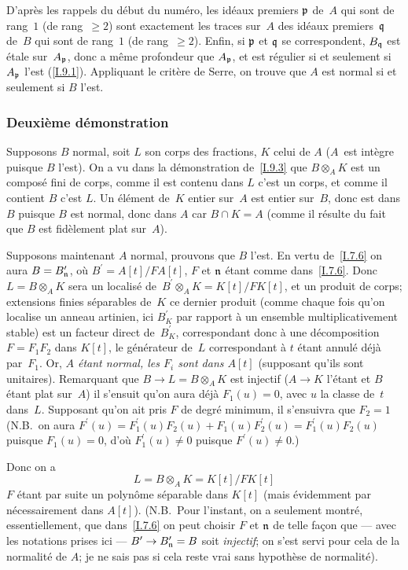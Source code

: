 D'apr\`es les rappels du d\'ebut du num\'ero, les id\'eaux
premiers $\mathfrak{p}$ de~$A$ qui sont de rang~$1$ (\resp de
rang~$\ge2$) sont exactement les traces sur~$A$ des id\'eaux
premiers~$\mathfrak{q}$ de~$B$ qui sont de rang~$1$ (\resp de
rang~$\ge2$). Enfin, si $\mathfrak{p}$ et $\mathfrak{q}$ se correspondent,
$B_{\mathfrak{q}}$ est \'etale sur~$A_{\mathfrak{p}}$, donc a m\^eme
profondeur que $A_{\mathfrak{p}}$, et est r\'egulier si et seulement si
$A_{\mathfrak{p}}$ l'est (\ref{I.9.1}). Appliquant le crit\`ere de Serre, on
trouve que $A$ est normal si et seulement si $B$ l'est.

\subsubsection*{Deuxi\`eme d\'emonstration}
Supposons $B$ normal, soit $L$ son corps des fractions, $K$ celui de
$A$ ($A$~est int\`egre puisque $B$ l'est). On a vu dans la
d\'emonstration de~\ref{I.9.3} que $B\otimes_A K$ est un compos\'e fini de
corps, comme il est contenu dans $L$ c'est un corps, et comme il
contient $B$ c'est $L$. Un \'el\'ement de~$K$ entier sur~$A$ est
entier sur~$B$, donc est dans $B$ puisque
$B$
est normal, donc dans $A$ car $B\cap K=A$ (comme il r\'esulte du
fait que $B$ est fid\`element plat sur~$A$).

Supposons maintenant $A$ normal, prouvons que $B$ l'est. En vertu
de~\ref{I.7.6} on aura $B=B^\prime_{\mathfrak{n}}$, o\`u $B^\prime=A[t]/FA[t]$,
$F$ et $\mathfrak{n}$ \'etant comme dans~\ref{I.7.6}. Donc $L=B\otimes_A K$
sera un localis\'e de~$B^\prime\otimes_A K=K[t]/FK[t]$, et un
produit de corps; extensions finies s\'eparables de~$K$ ce dernier
produit (comme chaque fois qu'on localise un anneau artinien, ici
$B^\prime_K$ par rapport \`a un ensemble multiplicativement stable)
est un facteur direct de~$B^\prime_K$, correspondant donc \`a une
d\'ecomposition $F=F_1F_2$ dans $K[t]$, le g\'en\'erateur de~$L$
correspondant \`a $t$ \'etant annul\'e d\'ej\`a par~$F_1$.
Or, \emph{$A$ étant normal, les $F_i$ sont dans $A[t]$} (supposant
qu'ils sont unitaires). Remarquant que $B\to L=B\otimes_A K$ est
injectif ($A\to K$ l'\'etant et $B$ \'etant plat sur~$A$) il
s'ensuit qu'on aura d\'ej\`a
$F_1(u)=0$, avec $u$ la
classe de~$t$ dans~$L$.
Supposant qu'on ait pris $F$ de degr\'e minimum, il s'ensuivra que
$F_2=1$ (N.B.\ on aura
$F^\prime(u)=F^\prime_1(u)F_2(u)+F_1(u)F^\prime_2(u)=F^\prime_1(u)F_2(u)$
puisque $F_1(u)=0$, d'o\`u $F^\prime_1(u)\neq0$ puisque
$F^\prime(u)\neq0$.)

Donc
on a
\begin{equation*}
\label{eq:I.9.5.*}
\tag{$*$} L=B\otimes_A K=K[t]/FK[t]
\end{equation*}
$F$ \'etant par suite un polyn\^ome s\'eparable dans $K[t]$
(mais \'evidemment par n\'ecessairement dans $A[t]$). (N.B.\ Pour
l'instant, on a seulement montr\'e, essentiellement, que dans~\ref{I.7.6} on
peut choisir $F$ et
$\mathfrak{n}$
de telle fa\c con que --- avec les notations prises ici --- $B^\prime\to B^\prime_{\goth{n}}=B$
soit \emph{injectif}; on s'est servi pour cela de la normalit\'e de
$A$; je ne sais pas si cela reste vrai sans hypoth\`ese de
normalit\'e).


